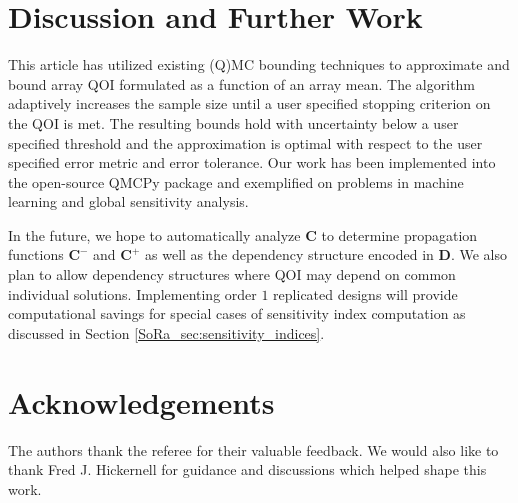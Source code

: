 \documentclass[graybox]{svmult}
\begin{document}
\section{Discussion and Further Work} \label{SoRa_sec:conclusions}

This article has utilized existing (Q)MC bounding techniques to approximate and bound array QOI formulated as a function of an array mean. The algorithm adaptively increases the sample size until a user specified stopping criterion on the QOI is met. The resulting bounds hold with uncertainty below a user specified threshold and the approximation is optimal with respect to the user specified error metric and error tolerance. Our work has been implemented into the open-source QMCPy package and exemplified on problems in machine learning and global sensitivity analysis. 

In the future, we hope to automatically analyze $\boldsymbol{C}$ to determine propagation functions $\boldsymbol{C}^-$ and $\boldsymbol{C}^+$ as well as the dependency structure encoded in $\boldsymbol{D}$. We also plan to allow dependency structures where QOI may depend on common individual solutions. Implementing order $1$ replicated designs will provide computational savings for special cases of sensitivity index computation as discussed in Section \ref{SoRa_sec:sensitivity_indices}. 

\section*{Acknowledgements}

The authors thank the referee for their valuable feedback. We would also like to thank Fred J. Hickernell for guidance and discussions which helped shape this work. 

% 
% 
\end{document}
